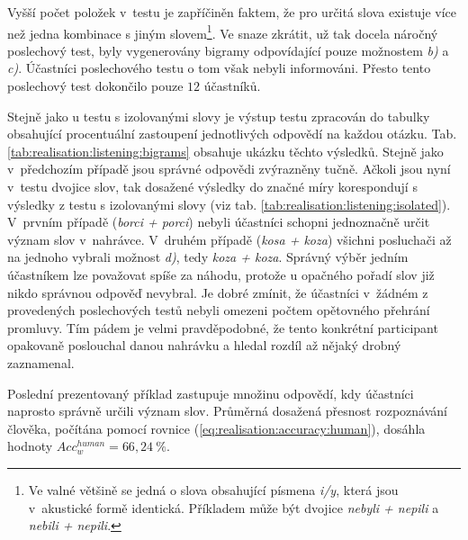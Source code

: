 Vyšší počet položek v~testu je zapříčiněn faktem, že pro určitá slova existuje více než jedna kombinace s jiným slovem\footnote{Ve valné většině se jedná o slova obsahující písmena \textit{i/y}, která jsou v~akustické formě identická. Příkladem může být dvojice \textit{nebyli + nepili} a \textit{nebili + nepili}.}. Ve snaze zkrátit, už tak docela náročný poslechový test, byly vygenerovány bigramy odpovídající pouze možnostem \textit{b)} a \textit{c)}. Účastníci poslechového testu o tom však nebyli informováni. Přesto tento poslechový test dokončilo pouze $12$ účastníků.

Stejně jako u testu s izolovanými slovy je výstup testu zpracován do tabulky obsahující procentuální zastoupení jednotlivých odpovědí na každou otázku.
Tab. \ref{tab:realisation:listening:bigrams} obsahuje ukázku těchto výsledků.
Stejně jako v~předchozím případě jsou správné odpovědi zvýrazněny tučně.
Ačkoli jsou nyní v~testu dvojice slov, tak dosažené výsledky do značné míry korespondují s výsledky z testu s izolovanými slovy (viz tab. \ref{tab:realisation:listening:isolated}).
V~prvním případě (\textit{borci + porci}) nebyli účastníci schopni jednoznačně určit význam slov v~nahrávce.
V~druhém případě (\textit{kosa + koza}) všichni posluchači až na jednoho vybrali možnost \textit{d)}, tedy \textit{koza + koza}.
Správný výběr jedním účastníkem lze považovat spíše za náhodu, protože u opačného pořadí slov již nikdo správnou odpověď nevybral.
Je dobré zmínit, že účastníci v~žádném z provedených poslechových testů nebyli omezeni počtem opětovného přehrání promluvy.
Tím pádem je velmi pravděpodobné, že tento konkrétní participant opakovaně poslouchal danou nahrávku a hledal rozdíl až nějaký drobný zaznamenal.

Poslední prezentovaný příklad zastupuje množinu odpovědí, kdy účastníci naprosto správně určili význam slov.
Průměrná dosažená přesnost rozpoznávání člověka, počítána pomocí rovnice (\ref{eq:realisation:accuracy:human}), dosáhla hodnoty $Acc_{w}^{human} = 66,24\ \%$.

